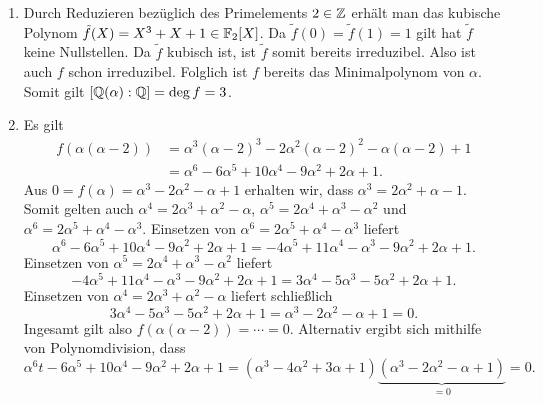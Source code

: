 \begin{solution}
  \begin{enumerate}
    \item
      Durch Reduzieren bezüglich des Primelements $2 \in \mathbb{Z}$ erhält man das kubische Polynom $\tilde{f}(X) = X^3 + X + 1 \in \mathbb{F}_2[X]$.
      Da $\tilde{f}(0) = \tilde{f}(1) = 1$ gilt hat $\tilde{f}$ keine Nullstellen.
      Da $\tilde{f}$ kubisch ist, ist $\tilde{f}$ somit bereits irreduzibel.
      Also ist auch $f$ schon irreduzibel.
      Folglich ist $f$ bereits das Minimalpolynom von $\alpha$.
      Somit gilt $[\mathbb{Q}(\alpha) : \mathbb{Q}] = \deg f = 3$.
      
    \item
      Es gilt
      \begin{align*}
        \label{equation: polynomial of degree 6}
            f(\alpha(\alpha-2))
        &=  \alpha^3 (\alpha-2)^3 - 2 \alpha^2 (\alpha-2)^2 - \alpha(\alpha-2) + 1
        \\
        &=  \alpha^6 - 6 \alpha^5 + 10 \alpha^4 - 9 \alpha^2 + 2 \alpha + 1.
      \end{align*}
      Aus $0 = f(\alpha) = \alpha^3 - 2 \alpha^2 - \alpha + 1$ erhalten wir, dass $\alpha^3 = 2 \alpha^2 + \alpha - 1$.
      Somit gelten auch $\alpha^4 = 2 \alpha^3 + \alpha^2 - \alpha$, $\alpha^5 = 2 \alpha^4 + \alpha^3 - \alpha^2$ und $\alpha^6 = 2 \alpha^5 + \alpha^4 - \alpha^3$.
      Einsetzen von $\alpha^6 = 2 \alpha^5 + \alpha^4 - \alpha^3$ liefert
      \[
          \alpha^6 - 6 \alpha^5 + 10 \alpha^4 - 9 \alpha^2 + 2 \alpha + 1
        = -4 \alpha^5 + 11 \alpha^4 - \alpha^3 - 9 \alpha^2 + 2 \alpha + 1.
      \]
      Einsetzen von $\alpha^5 = 2 \alpha^4 + \alpha^3 - \alpha^2$ liefert
      \[
          -4 \alpha^5 + 11 \alpha^4 - \alpha^3 - 9 \alpha^2 + 2 \alpha + 1
        = 3 \alpha^4 - 5 \alpha^3 - 5 \alpha^2 + 2 \alpha + 1.
      \]
      Einsetzen von $\alpha^4 = 2 \alpha^3 + \alpha^2 - \alpha$ liefert schließlich
      \[
          3 \alpha^4 - 5 \alpha^3 - 5 \alpha^2 + 2 \alpha + 1
        = \alpha^3 - 2 \alpha^2 - \alpha + 1
        = 0.
      \]
      Ingesamt gilt also $f(\alpha (\alpha - 2)) = \dotsb = 0$.
      Alternativ ergibt sich mithilfe von Polynomdivision, dass
      \[
          \alpha^6t - 6 \alpha^5 + 10 \alpha^4 - 9 \alpha^2 + 2 \alpha + 1
        = (\alpha^3 - 4 \alpha^2 + 3 \alpha + 1)\underbrace{(\alpha^3 - 2 \alpha^2 - \alpha + 1)}_{=0}
        = 0.
      \]
      

\end{enumerate}
\end{solution}
